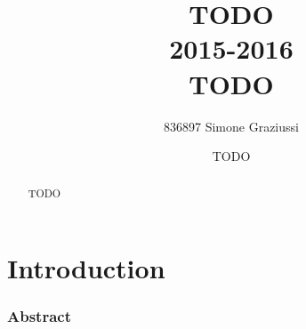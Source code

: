 \documentclass[11pt,a4paper,notitlepage]{article}
\title{\Large{TODO\\2015-2016}\\\Huge{TODO}}
\author{836897 Simone Graziussi}
\date{TODO}
\begin{document}
\sloppy


\begin{titlingpage}
    \maketitle
    \begin{abstract}
        \large{TODO}
    \end{abstract}
\end{titlingpage}



\newpage
\tableofcontents
\newpage



\part{Introduction}

\section{Abstract}
\end{document}

